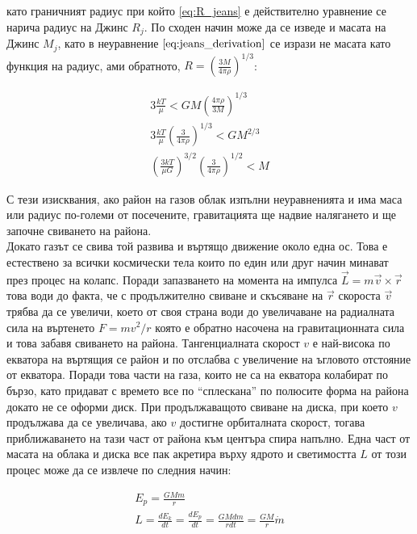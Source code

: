 \documentclass[a4paper,12pt]{article}
\begin{document}
като граничният радиус при който \eqref{eq:R_jeans} е действително уравнение се нарича радиус на Джинс $R_j$. По сходен начин може да се изведе и масата на Джинс $M_j$, като в неуравнение $\eqref{eq:jeans_derivation}$ се изрази не масата като функция на радиус, ами обратното, $R=(\frac{3M}{4\pi \rho})^{1/3}$:

\begin{gather}
    3\frac{kT}{\mu} < GM \left( \frac{4\pi \rho}{3M} \right)^{1/3}\\
    3\frac{kT}{\mu} \left( \frac{3}{4\pi \rho} \right)^{1/3} < GM^{2/3}\\
    \left( \frac{3kT}{\mu G} \right)^{3/2} \left( \frac{3}{4\pi \rho} \right)^{1/2} < M
\end{gather}

С тези изисквания, ако район на газов облак изпълни неуравненията и има маса или радиус по-големи от посечените, гравитацията ще надвие налягането и ще започне свиването на района.\\

Докато газът се свива той развива и въртящо движение около една ос. Това е естествено за всички космически тела които по един или друг начин минават през процес на колапс. Поради запазването на момента на импулса $\Vec{L} = m\Vec{v} \times \Vec{r}$ това води до факта, че с продължително свиване и скъсяване на $\Vec{r}$ скороста $\Vec{v}$ трябва да се увеличи, което от своя страна води до увеличаване на радиалната сила на въртенето $F=mv^2/r$ която е обратно насочена на гравитационната сила и това забавя свиването на района. Тангенциалната скорост $v$ е най-висока по екватора на въртящия се район и по отслабва с увеличение на ъгловото отстояние от екватора. Поради това части на газа, които не са на екватора колабират по бързо, като придават с времето все по ``сплескана'' по полюсите форма на района докато не се оформи диск. При продължаващото свиване на диска, при което $v$ продължава да се увеличава, ако $v$ достигне орбиталната скорост, тогава приближаването на тази част от района към центъра спира напълно. Една част от масата на облака и диска все пак акретира върху ядрото и светимостта $L$ от този процес може да се извлече по следния начин: 

\begin{gather}
    E_p = \frac{GMm}{r}\\
    L = \frac{dE_k}{dt} = \frac{dE_p}{dt} = \frac{GM dm}{rdt} = \frac{GM}{r} \dot{m}
    \label{eq:L_acretion}
\end{gather}
\end{document}
